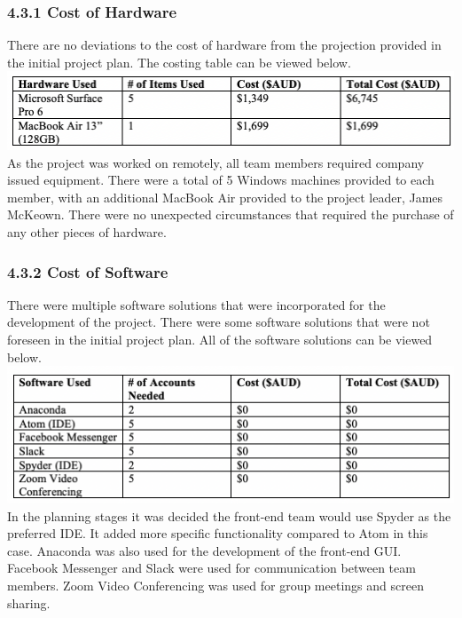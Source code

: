 \documentclass[11pt]{article}
\begin{document}
\begin{adjustwidth}{1cm}{}

\subsubsection{4.3.1 Cost of Hardware}
There are no deviations to the cost of hardware from the projection provided in the initial project plan. The costing table can be viewed below. \\

\includegraphics[scale=0.71]{hardware_table.png} \\

As the project was worked on remotely, all team members required company issued equipment. There were a total of 5 Windows machines provided to each member, with an additional MacBook Air provided to the project leader, James McKeown. There were no unexpected circumstances that required the purchase of any other pieces of hardware.

\subsubsection{4.3.2 Cost of Software}
There were multiple software solutions that were incorporated for the development of the project. There were some software solutions that were not foreseen in the initial project plan. All of the software solutions can be viewed below. \\

\includegraphics[scale=0.71]{software_table.png} \\

In the planning stages it was decided the front-end team would use Spyder as the preferred IDE. It added more specific functionality compared to Atom in this case. Anaconda was also used for the development of the front-end GUI. Facebook Messenger and Slack were used for communication between team members. Zoom Video Conferencing was used for group meetings and screen sharing. \\


\end{adjustwidth}
\end{document}
